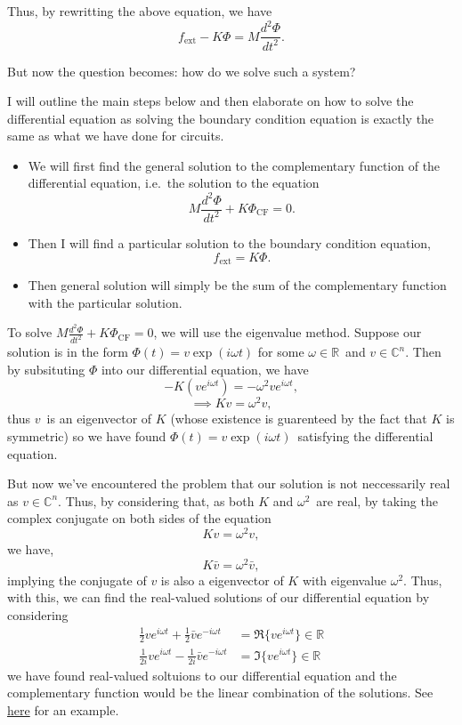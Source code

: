 \documentclass[]{article}
\providecommand{\tightlist}{%
  \setlength{\itemsep}{0pt}\setlength{\parskip}{0pt}}
\begin{document}
Thus, by rewritting the above equation, we have \[
f_{\text{ext}} - K \Phi =  M \frac{d^2\Phi}{dt^2}.
\]

But now the question becomes: how do we solve such a system?

I will outline the main steps below and then elaborate on how to solve
the differential equation as solving the boundary condition equation is
exactly the same as what we have done for circuits.

\begin{itemize}
\tightlist
\item
  We will first find the general solution to the complementary function
  of the differential equation, i.e.~the solution to the equation
  \[ M \frac{d^2\Phi}{dt^2} + K \Phi_{\text{CF}} = 0. \]
\item
  Then I will find a particular solution to the boundary condition
  equation, \[f_{\text{ext}} = K\Phi.\]
\item
  Then general solution will simply be the sum of the complementary
  function with the particular solution.
\end{itemize}

To solve \(M \frac{d^2\Phi}{dt^2} + K \Phi_{\text{CF}} = 0\), we will
use the eigenvalue method. Suppose our solution is in the form
\(\Phi(t) = v \exp(i \omega t)\) for some \(\omega \in \mathbb{R}\)~and
\(v \in \mathbb{C}^n\). Then by subsituting \(\Phi\) into our
differential equation, we have
\[-K(ve^{i\omega t}) = - \omega^2 v e^{i\omega t},\]
\[\implies K v = \omega^2 v,\] thus \(v\)~is an eigenvector of \(K\)
(whose existence is guarenteed by the fact that \(K\) is symmetric) so
we have found \(\Phi(t) = v\exp(i \omega t)\)~satisfying the
differential equation.

But now we've encountered the problem that our solution is not
neccessarily real as \(v \in \mathbb{C}^n\). Thus, by considering that,
as both \(K\) and \(\omega^2\)~are real, by taking the complex conjugate
on both sides of the equation \[Kv = \omega^2 v,\] we have,
\[K\bar{v} = \omega^2 \bar{v},\] implying the conjugate of \(v\) is also
a eigenvector of \(K\) with eigenvalue \(\omega^2\). Thus, with this, we
can find the real-valued solutions of our differential equation by
considering \[
\begin{split}
\frac{1}{2}ve^{i \omega t} + \frac{1}{2} \bar{v}e^{-i \omega t} & = \Re\{ve^{i \omega t}\} \in \mathbb{R}\\
\frac{1}{2i}ve^{i \omega t} - \frac{1}{2i} \bar{v}e^{-i \omega t} & = \Im\{ve^{i \omega t}\} \in \mathbb{R}
\end{split}
\] we have found real-valued soltuions to our differential equation and
the complementary function would be the linear combination of the
solutions. See \href{https://www.overleaf.com/read/jgsdhbwydjgt}{here}
for an example.
\end{document}

